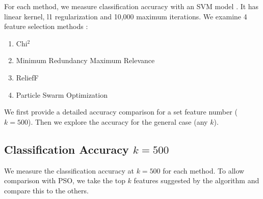 \documentclass[runningheads]{llncs}
\begin{document}
For each method, we measure classification accuracy with an SVM model \cite{sklearn2021feature}.
It has linear kernel, l1 regularization \cite{robnik2003theoretical} and 10,000 maximum iterations.
We examine 4 feature selection methods \cite{chappers2015skfeature}:

\begin{enumerate}
  \item Chi$^2$ \cite{liu1995chi2}
  \item Minimum Redundancy Maximum Relevance \cite{ding2005minimum}
  \item ReliefF \cite{robnik2003theoretical}
  \item Particle Swarm Optimization \cite{kennedy1995particle,kennedy1997discrete}
\end{enumerate}

We first provide a detailed accuracy comparison for a set feature number ($k = 500$).
Then we explore the accuracy for the general case (any $k$).

\subsection{Classification Accuracy $k = 500$}

We measure the classification accuracy at $k = 500$ for each method.
To allow comparison with PSO, we take the top $k$ features suggested by the algorithm and compare this to the others.
\end{document}
